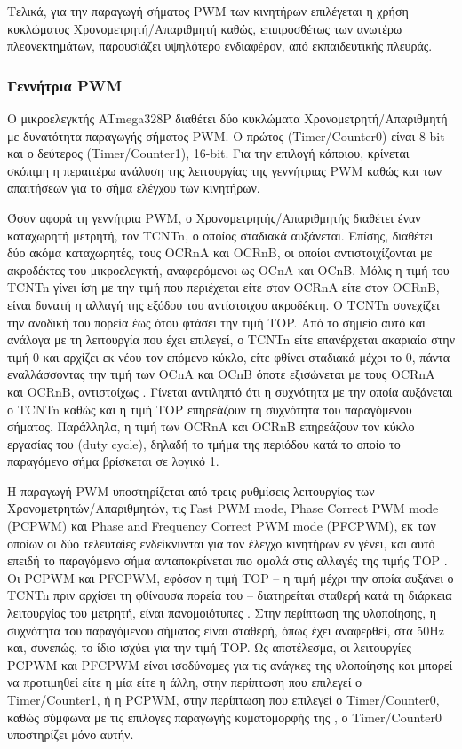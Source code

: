 Τελικά, για την παραγωγή σήματος PWM των κινητήρων επιλέγεται η χρήση κυκλώματος
Χρονομετρητή\slash Απαριθμητή καθώς, επιπροσθέτως των ανωτέρω πλεονεκτημάτων,
παρουσιάζει υψηλότερο ενδιαφέρον, από εκπαιδευτικής πλευράς.

\subsubsection{Γεννήτρια PWM}

Ο μικροελεγκτής ATmega328P διαθέτει δύο κυκλώματα Χρονομετρητή\slash Απαριθμητή
με δυνατότητα παραγωγής σήματος PWM. Ο πρώτος (Timer\slash Counter0) είναι 8-bit
και ο δεύτερος (Timer\slash Counter1), 16-bit. Για την επιλογή κάποιου, κρίνεται
σκόπιμη η περαιτέρω ανάλυση της λειτουργίας της γεννήτριας PWM καθώς και των
απαιτήσεων για το σήμα ελέγχου των κινητήρων.

Όσον αφορά τη γεννήτρια PWM, ο Χρονομετρητής\slash Απαριθμητής διαθέτει έναν
καταχωρητή μετρητή, τον TCNTn, ο οποίος σταδιακά αυξάνεται. Επίσης, διαθέτει
δύο ακόμα καταχωρητές, τους OCRnA και OCRnB, οι οποίοι αντιστοιχίζονται με
ακροδέκτες του μικροελεγκτή, αναφερόμενοι ως OCnA και OCnB. Μόλις η τιμή του
TCNTn γίνει ίση με την τιμή που περιέχεται είτε στον OCRnA είτε στον OCRnB,
είναι δυνατή η αλλαγή της εξόδου του αντίστοιχου ακροδέκτη. Ο TCNTn συνεχίζει
την ανοδική του πορεία έως ότου φτάσει την τιμή TOP. Από το σημείο αυτό και
ανάλογα με τη λειτουργία που έχει επιλεγεί, ο TCNTn είτε επανέρχεται ακαριαία
στην τιμή 0 και αρχίζει εκ νέου τον επόμενο κύκλο, είτε φθίνει σταδιακά μέχρι το
0, πάντα εναλλάσσοντας την τιμή των OCnA και OCnB όποτε εξισώνεται με τους OCRnA
και OCRnB, αντιστοίχως \parencite[100--102,124--129]{atmel13}.
Γίνεται αντιληπτό ότι η συχνότητα με την οποία αυξάνεται ο TCNTn καθώς και η
τιμή TOP επηρεάζουν τη συχνότητα του παραγόμενου σήματος. Παράλληλα, η τιμή των
OCRnA και OCRnB επηρεάζουν τον κύκλο εργασίας του (\textenglish{duty cycle}),
δηλαδή το τμήμα της περιόδου κατά το οποίο το παραγόμενο σήμα βρίσκεται σε
λογικό 1.

Η παραγωγή PWM υποστηρίζεται από τρεις ρυθμίσεις λειτουργίας των
Χρονομετρητών\slash Απαριθμητών, τις \textenglish{Fast PWM mode, Phase Correct
PWM mode (PCPWM)} και \textenglish{Phase and Frequency Correct PWM mode
(PFCPWM)}, εκ των οποίων οι δύο τελευταίες ενδείκνυνται για τον έλεγχο κινητήρων
εν γένει, και αυτό επειδή το παραγόμενο σήμα ανταποκρίνεται πιο ομαλά στις
αλλαγές της τιμής TOP \parencite[126,128]{atmel13}. Οι PCPWM και PFCPWM, εφόσον
η τιμή TOP -- η τιμή μέχρι την οποία αυξάνει ο TCNTn πριν αρχίσει τη φθίνουσα
πορεία του -- διατηρείται σταθερή κατά τη διάρκεια λειτουργίας του μετρητή,
είναι πανομοιότυπες \parencite[127]{atmel13}. Στην περίπτωση της υλοποίησης, η
συχνότητα του παραγόμενου σήματος είναι σταθερή, όπως έχει αναφερθεί, στα 50Hz
και, συνεπώς, το ίδιο ισχύει για την τιμή TOP. Ως αποτέλεσμα, οι λειτουργίες
PCPWM και PFCPWM είναι ισοδύναμες για τις ανάγκες της υλοποίησης και μπορεί να
προτιμηθεί είτε η μία είτε η άλλη, στην περίπτωση που επιλεγεί ο
\textenglish{Timer\slash Counter1}, ή η PCPWM, στην περίπτωση που επιλεγεί ο
\textenglish{Timer\slash Counter0}, καθώς σύμφωνα με τις επιλογές παραγωγής
κυματομορφής της \textcite[107]{atmel13}, ο \textenglish{Timer\slash Counter0}
υποστηρίζει μόνο αυτήν.

